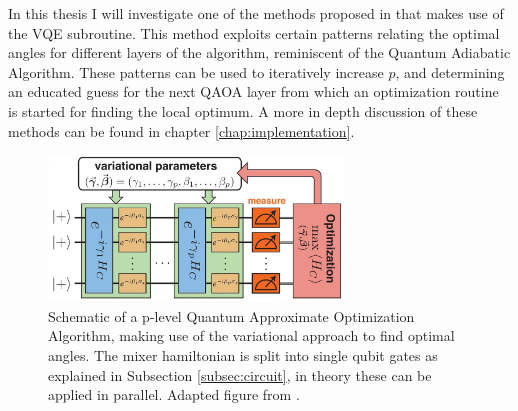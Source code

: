In this thesis I will investigate one of the methods proposed in \cite{ZWCPL18} that makes use of the VQE subroutine. This method exploits certain patterns relating the optimal angles for different layers of the algorithm, reminiscent of the Quantum Adiabatic Algorithm. These patterns can be used to iteratively increase $p$, and determining an educated guess for the next QAOA layer from which an optimization routine is started for finding the local optimum. A more in depth discussion of these methods can be found in chapter \ref{chap:implementation}.
\begin{figure}[H]
	\centering
	\includegraphics[width=0.7\textwidth]{figures/qaoa_idea_edit2.png}
	\caption{Schematic of a p-level Quantum Approximate Optimization Algorithm, making use of the variational approach to find optimal angles. The mixer hamiltonian is split into single qubit gates as explained in Subsection \ref{subsec:circuit}, in theory these can be applied in parallel. Adapted figure from \cite{ZWCPL18}.}
	\label{fig:schematic-qaoa-vqe}
\end{figure}


